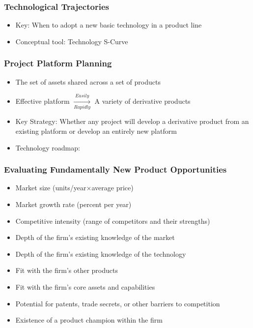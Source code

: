 \documentclass[a4paper,12pt,openany]{book}
\begin{document}
\subsubsection{Technological Trajectories}
\begin{itemize}
    \item Key: When to adopt a new basic technology in a product line
    \item Conceptual tool: Technology S-Curve
\end{itemize}
\subsubsection{Project Platform Planning}
\begin{itemize}
    \item The set of assets shared across a set of products
    \item Effective platform $\xrightarrow[Rapidly]{Easily}$ A variety of derivative products
    \item Key Strategy: Whether any project will develop a derivative product from an existing platform or develop an entirely new platform
    \item Technology roadmap: 
\end{itemize}

\subsubsection{Evaluating Fundamentally New Product Opportunities}
\begin{itemize}
    \item Market size (units/year$\times$average price)
    \item Market growth rate (percent per year)
    \item Competitive intensity (range of competitors and their strengths)
    \item Depth of the firm's existing knowledge of the market
    \item Depth of the firm's existing knowledge of the technology
    \item Fit with the firm's other products
    \item Fit with the firm's core assets and capabilities
    \item Potential for patents, trade secrets, or other barriers to competition
    \item Existence of a product champion within the firm
\end{itemize}
\end{document}
